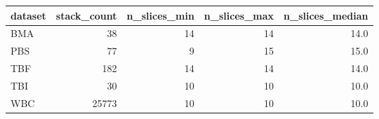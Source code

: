 \begin{tabular}{lrrrr}
\hline
dataset & stack\_count & n\_slices\_min & n\_slices\_max & n\_slices\_median \\
\hline
BMA & 38 & 14 & 14 & 14.0 \\
PBS & 77 & 9 & 15 & 15.0 \\
TBF & 182 & 14 & 14 & 14.0 \\
TBI & 30 & 10 & 10 & 10.0 \\
WBC & 25773 & 10 & 10 & 10.0 \\
\hline
\end{tabular}
